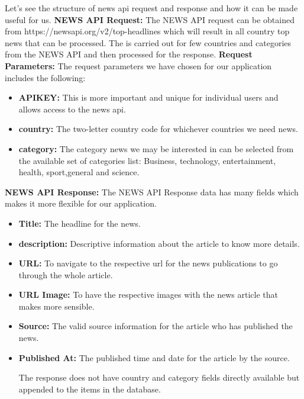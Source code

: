Let's see the structure of news api request and response and how it can be made useful for us.\newline
\textbf{NEWS API Request:} \newline
 The NEWS API request can be obtained from https://newsapi.org/v2/top-headlines
 which will result in all country top news that can be processed. \newline
The is carried out for few countries and categories from the NEWS API and then processed for the response. \newline
\textbf{Request Parameters: }\newline
 The request parameters we have chosen for our application includes the following: 
 \begin{itemize}
     \item \textbf{APIKEY:} This is more important and unique for individual users and allows access to the news api. 
     \item \textbf{country:} The two-letter country code for whichever countries we need news.
      \item \textbf{category:} The category news we may be interested in can be selected from the available set of categories list: Business, technology, entertainment, health, sport,general and science.
 \end{itemize} 

\textbf{NEWS API Response: }\newline
    The NEWS API Response data has many fields which makes it more flexible for our application. 
  \begin{itemize}
     \item \textbf{Title:} The headline for the news.
     \item \textbf{description:} Descriptive information about the article to know more details.
     \item \textbf{URL:} To navigate to the respective url for the news publications to go through the whole article.
     \item \textbf{URL Image:} To have the respective images with the news article that makes more sensible.
     \item \textbf{Source:} The valid source information for the article who has published the news.
     \item \textbf{Published At:} The published time and date for the article by the source.
     
     The response does not have country and category fields directly available but appended to the items in the database.
     
  \end{itemize}  
 
